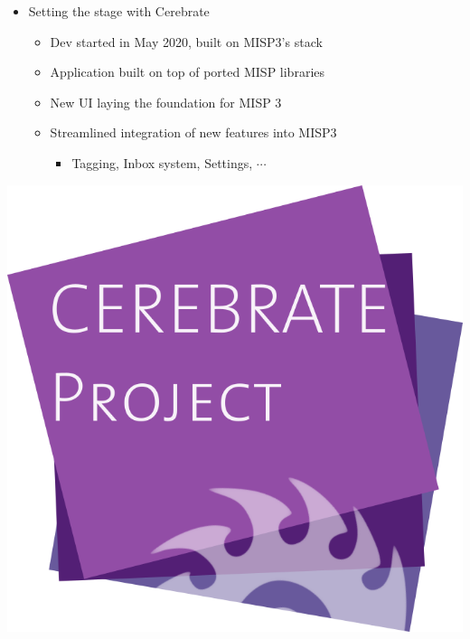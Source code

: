 \begin{frame}
    \vspace{1em}
    \begin{minipage}{0.85\textwidth}
        \begin{itemize}
            \item Setting the stage with Cerebrate
            \begin{itemize}
                \item Dev started in May 2020, built on MISP3's stack
                \item Application built on top of ported MISP libraries
                \item New UI laying the foundation for MISP 3
                \item Streamlined integration of new features into MISP3
                \vspace{-0.5em}
                \begin{itemize}
                    \item Tagging, Inbox system, Settings, $\cdots$
                \end{itemize}
            \end{itemize}
        \end{itemize}
    \end{minipage}%
    \begin{minipage}{0.15\textwidth}
        \begin{center}
            \;\includegraphics[width=0.8\linewidth]{pictures/cerebrate.png}
        \end{center}
    \end{minipage}
\end{frame}

